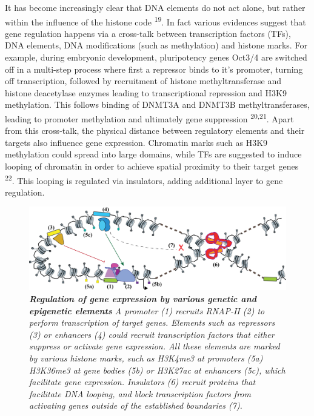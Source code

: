 \documentclass[11pt,twoside]{MPIthesis}
\theoremstyle{definition}
\theoremstyle{definition}
\theoremstyle{definition}
\theoremstyle{remark}
\begin{document}
It has become increasingly clear that DNA elements do not act alone, but
rather within the influence of the histone code \textsuperscript{19}. In
fact various evidences suggest that gene regulation happens via a
cross-talk between transcription factors (TFs), DNA elements, DNA
modifications (such as methylation) and histone marks. For example,
during embryonic development, pluripotency genes Oct3/4 are switched off
in a multi-step process where first a repressor binds to it's promoter,
turning off transcription, followed by recruitment of histone
methyltransferase and histone deacetylase enzymes leading to
transcriptional repression and H3K9 methylation. This follows binding of
DNMT3A and DNMT3B methyltransferases, leading to promoter methylation
and ultimately gene suppression \textsuperscript{20,21}. Apart from this
cross-talk, the physical distance between regulatory elements and their
targets also influence gene expression. Chromatin marks such as H3K9
methylation could spread into large domains, while TFs are suggested to
induce looping of chromatin in order to achieve spatial proximity to
their target genes \textsuperscript{22}. This looping is regulated via
insulators, adding additional layer to gene regulation.
\begin{figure}

{\centering \includegraphics[width=0.8\linewidth]{figures/intro_fig1} 

}

\caption[Regulation of gene expression by various genetic and epigenetic elements]{\emph{\textbf{Regulation of gene expression by various
genetic and epigenetic elements} A promoter (1) recruits RNAP-II (2) to
perform transcription of target genes. Elements such as repressors (3)
or enhancers (4) could recruit transcription factors that either
suppress or activate gene expression. All these elements are marked by
various histone marks, such as H3K4me3 at promoters (5a) H3K36me3 at
gene bodies (5b) or H3K27ac at enhancers (5c), which facilitate gene
expression. Insulators (6) recruit proteins that facilitate DNA looping,
and block transcription factors from activating genes outside of the
established boundaries (7).}}\label{fig:unnamed-chunk-1}
\end{figure}
\end{document}
